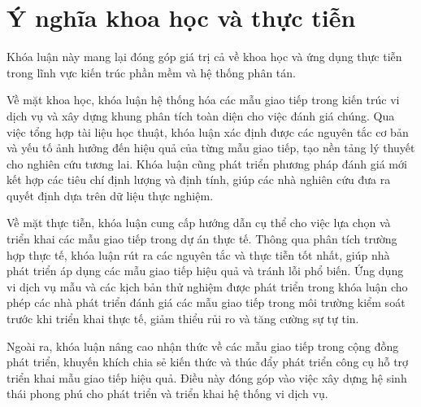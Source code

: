 \section{Ý nghĩa khoa học và thực tiễn}
Khóa luận này mang lại đóng góp giá trị cả về khoa học và ứng dụng thực tiễn trong lĩnh vực kiến trúc phần mềm và hệ thống phân tán.

Về mặt khoa học, khóa luận hệ thống hóa các mẫu giao tiếp trong kiến trúc vi dịch vụ và xây dựng khung phân tích toàn diện cho việc đánh giá chúng. Qua việc tổng hợp tài liệu học thuật, khóa luận xác định được các nguyên tắc cơ bản và yếu tố ảnh hưởng đến hiệu quả của từng mẫu giao tiếp, tạo nền tảng lý thuyết cho nghiên cứu tương lai. Khóa luận cũng phát triển phương pháp đánh giá mới kết hợp các tiêu chí định lượng và định tính, giúp các nhà nghiên cứu đưa ra quyết định dựa trên dữ liệu thực nghiệm.

Về mặt thực tiễn, khóa luận cung cấp hướng dẫn cụ thể cho việc lựa chọn và triển khai các mẫu giao tiếp trong dự án thực tế. Thông qua phân tích trường hợp thực tế, khóa luận rút ra các nguyên tắc và thực tiễn tốt nhất, giúp nhà phát triển áp dụng các mẫu giao tiếp hiệu quả và tránh lỗi phổ biến. Ứng dụng vi dịch vụ mẫu và các kịch bản thử nghiệm được phát triển trong khóa luận cho phép các nhà phát triển đánh giá các mẫu giao tiếp trong môi trường kiểm soát trước khi triển khai thực tế, giảm thiểu rủi ro và tăng cường sự tự tin.

Ngoài ra, khóa luận nâng cao nhận thức về các mẫu giao tiếp trong cộng đồng phát triển, khuyến khích chia sẻ kiến thức và thúc đẩy phát triển công cụ hỗ trợ triển khai mẫu giao tiếp hiệu quả. Điều này đóng góp vào việc xây dựng hệ sinh thái phong phú cho phát triển và triển khai hệ thống vi dịch vụ.